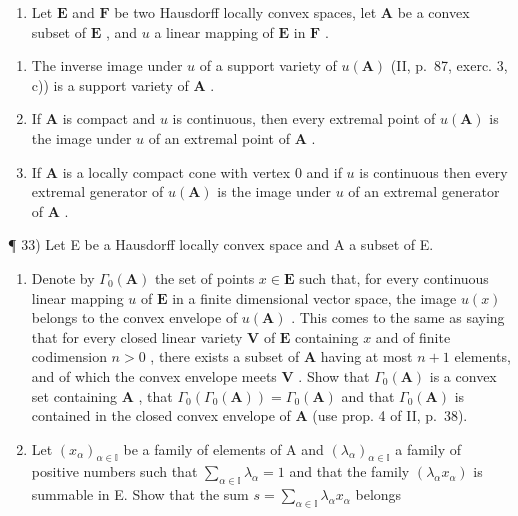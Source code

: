 \begin{enumerate}
\def\labelenumi{\arabic{enumi})}
\setcounter{enumi}{31}
\tightlist
\item
  Let \(\mathbf{E}\) and \(\mathbf{F}\) be two Hausdorff locally convex spaces, let \(\mathbf{A}\) be a convex subset of \(\mathbf{E}\) , and \(u\) a linear mapping of \(\mathbf{E}\) in \(\mathbf{F}\) .
\end{enumerate}

\begin{enumerate}
\def\labelenumi{\alph{enumi})}
\item
  The inverse image under \(u\) of a support variety of \(u(\mathbf{A})\) (II, p.~87, exerc. 3, c)) is a support variety of \(\mathbf{A}\) .
\item
  If \(\mathbf{A}\) is compact and \(u\) is continuous, then every extremal point of \(u(\mathbf{A})\) is the image under \(u\) of an extremal point of \(\mathbf{A}\) .
\item
  If \(\mathbf{A}\) is a locally compact cone with vertex 0 and if \(u\) is continuous then every extremal generator of \(u(\mathbf{A})\) is the image under \(u\) of an extremal generator of \(\mathbf{A}\) .
\end{enumerate}

¶ 33) Let E be a Hausdorff locally convex space and A a subset of E.

\begin{enumerate}
\def\labelenumi{\alph{enumi})}
\item
  Denote by \(\Gamma_0(\mathbf{A})\) the set of points \(x \in \mathbf{E}\) such that, for every continuous linear mapping \(u\) of \(\mathbf{E}\) in a finite dimensional vector space, the image \(u(x)\) belongs to the convex envelope of \(u(\mathbf{A})\) . This comes to the same as saying that for every closed linear variety \(\mathbf{V}\) of \(\mathbf{E}\) containing \(x\) and of finite codimension \(n > 0\) , there exists a subset of \(\mathbf{A}\) having at most \(n + 1\) elements, and of which the convex envelope meets \(\mathbf{V}\) . Show that \(\Gamma_0(\mathbf{A})\) is a convex set containing \(\mathbf{A}\) , that \(\Gamma_0(\Gamma_0(\mathbf{A})) = \Gamma_0(\mathbf{A})\) and that \(\Gamma_0(\mathbf{A})\) is contained in the closed convex envelope of \(\mathbf{A}\) (use prop. 4 of II, p.~38).
\item
  Let \((x_{\alpha})_{\alpha \in \mathbb{I}}\) be a family of elements of A and \((\lambda_{\alpha})_{\alpha \in \mathbb{I}}\) a family of positive numbers such that \(\sum_{\alpha \in \mathbb{I}}\lambda_{\alpha} = 1\) and that the family \((\lambda_{\alpha}x_{\alpha})\) is summable in E. Show that the sum \(s = \sum_{\alpha \in \mathbb{I}}\lambda_{\alpha}x_{\alpha}\) belongs
\end{enumerate}

